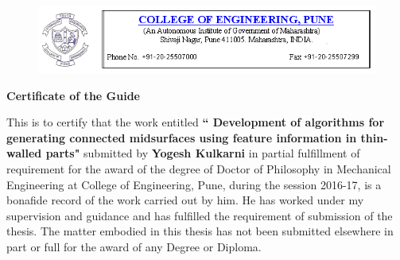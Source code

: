 \begin{figure} [!h]
	\centering
	\includegraphics[width=\linewidth]{..//Common/images/coep_header.png}
\end{figure}

\vspace*{50pt}

\begin{center}{\Huge \textbf{Certificate of the Guide}}\end{center}

\vspace*{20pt}

\begin{flushleft}
This is to certify that the work entitled \textbf{`` Development of algorithms for generating connected midsurfaces using feature information in thin-walled parts"} submitted by \textbf{Yogesh Kulkarni} 
in partial fulfillment of requirement for the award of the degree of Doctor of Philosophy in Mechanical Engineering at College of Engineering, Pune, during the session 2016-17, is a bonafide record of the work carried out by him. He has worked under my supervision and guidance and has fulfilled the requirement of submission of the thesis. The matter embodied in this thesis has not been submitted elsewhere in part or full for the award of any Degree or Diploma.
\end{flushleft}

\vspace*{85pt}

